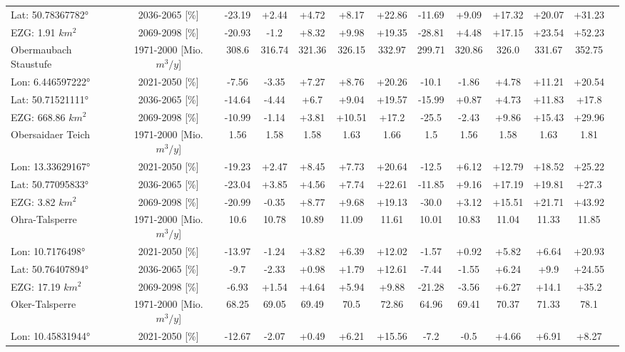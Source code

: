 \begin{longtable}{@{\extracolsep{\fill}}lc|ccccc||cccccc}
Lat: 50.78367782° & 2036-2065 [\%]  & -23.19 & +2.44 & +4.72 & +8.17 & +22.86 & -11.69 & +9.09 & +17.32 & +20.07 & +31.23 & \\ 
EZG: 1.91 $km^2$ & 2069-2098 [\%]  & -20.93 & -1.2 & +8.32 & +9.98 & +19.35 & -28.81 & +4.48 & +17.15 & +23.54 & +52.23 & \\ 
\hline 
Obermaubach Staustufe & 1971-2000 [Mio. $m^3/y$]  & 308.6 & 316.74 & 321.36 & 326.15 & 332.97 & 299.71 & 320.86 & 326.0 & 331.67 & 352.75 & \\ 
\cline{2-13} 
Lon: 6.446597222° & 2021-2050 [\%]  & -7.56 & -3.35 & +7.27 & +8.76 & +20.26 & -10.1 & -1.86 & +4.78 & +11.21 & +20.54 & \\ 
Lat: 50.71521111° & 2036-2065 [\%]  & -14.64 & -4.44 & +6.7 & +9.04 & +19.57 & -15.99 & +0.87 & +4.73 & +11.83 & +17.8 & \\ 
EZG: 668.86 $km^2$ & 2069-2098 [\%]  & -10.99 & -1.14 & +3.81 & +10.51 & +17.2 & -25.5 & -2.43 & +9.86 & +15.43 & +29.96 & \\ 
\hline 
Obersaidaer Teich & 1971-2000 [Mio. $m^3/y$]  & 1.56 & 1.58 & 1.58 & 1.63 & 1.66 & 1.5 & 1.56 & 1.58 & 1.63 & 1.81 & \\ 
\cline{2-13} 
Lon: 13.33629167° & 2021-2050 [\%]  & -19.23 & +2.47 & +8.45 & +7.73 & +20.64 & -12.5 & +6.12 & +12.79 & +18.52 & +25.22 & \\ 
Lat: 50.77095833° & 2036-2065 [\%]  & -23.04 & +3.85 & +4.56 & +7.74 & +22.61 & -11.85 & +9.16 & +17.19 & +19.81 & +27.3 & \\ 
EZG: 3.82 $km^2$ & 2069-2098 [\%]  & -20.99 & -0.35 & +8.77 & +9.68 & +19.13 & -30.0 & +3.12 & +15.51 & +21.71 & +43.92 & \\ 
\hline 
Ohra-Talsperre & 1971-2000 [Mio. $m^3/y$]  & 10.6 & 10.78 & 10.89 & 11.09 & 11.61 & 10.01 & 10.83 & 11.04 & 11.33 & 11.85 & \\ 
\cline{2-13} 
Lon: 10.7176498° & 2021-2050 [\%]  & -13.97 & -1.24 & +3.82 & +6.39 & +12.02 & -1.57 & +0.92 & +5.82 & +6.64 & +20.93 & \\ 
Lat: 50.76407894° & 2036-2065 [\%]  & -9.7 & -2.33 & +0.98 & +1.79 & +12.61 & -7.44 & -1.55 & +6.24 & +9.9 & +24.55 & \\ 
EZG: 17.19 $km^2$ & 2069-2098 [\%]  & -6.93 & +1.54 & +4.64 & +5.94 & +9.88 & -21.28 & -3.56 & +6.27 & +14.1 & +35.2 & \\ 
\hline 
Oker-Talsperre & 1971-2000 [Mio. $m^3/y$]  & 68.25 & 69.05 & 69.49 & 70.5 & 72.86 & 64.96 & 69.41 & 70.37 & 71.33 & 78.1 & \\ 
\cline{2-13} 
Lon: 10.45831944° & 2021-2050 [\%]  & -12.67 & -2.07 & +0.49 & +6.21 & +15.56 & -7.2 & -0.5 & +4.66 & +6.91 & +8.27 & \\ 

\end{longtable}
